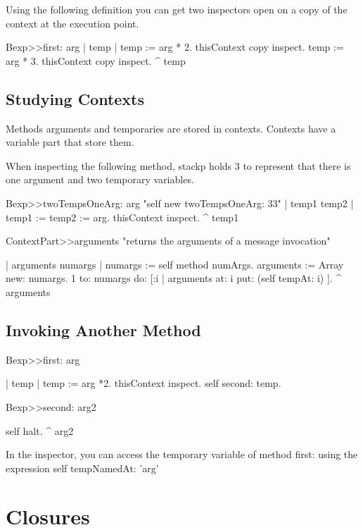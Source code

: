 \documentclass[a4paper,10pt,twoside]{book}
\begin{document}
Using the following definition you can get two inspectors open on a copy of the context
at the execution point.
\begin{code}
Bexp>>first: arg
	| temp |
	temp := arg * 2.
	thisContext copy inspect.
	temp := arg * 3.
	thisContext copy inspect.
	^ temp
\end{code}

\subsection{Studying Contexts}
Methods arguments and temporaries are stored in contexts. Contexts have a variable part that
store them.

When inspecting the following method, stackp holds 3 to represent that there is one argument
and two temporary variables.

\begin{code}{}
Bexp>>twoTempsOneArg: arg
	"self new twoTempsOneArg: 33"
	| temp1 temp2 |
	temp1 := temp2 := arg.
	thisContext inspect.
	^ temp1
\end{code}


\begin{code}{}
ContextPart>>arguments
	"returns the arguments of a message invocation"

	| arguments numargs |
	numargs :=  self method numArgs.
	arguments := Array new: numargs.
	1 to: numargs do: [:i | arguments at: i put: (self tempAt: i) ].
	^ arguments
\end{code}






\subsection{Invoking Another Method}
\begin{code}{}
Bexp>>first: arg

	| temp |
	temp := arg *2.
	thisContext inspect.
	self second: temp.

Bexp>>second: arg2

	self halt.
	^ arg2
\end{code}

In the inspector, you can access the temporary variable of method first: using the expression self tempNamedAt: 'arg'









\section{Closures}
\end{document}
